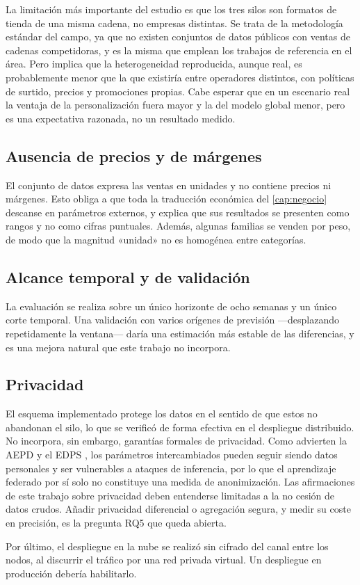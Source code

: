 La limitación más importante del estudio es que los tres silos son formatos de tienda de una misma
cadena, no empresas distintas. Se trata de la metodología estándar del campo, ya que no existen
conjuntos de datos públicos con ventas de cadenas competidoras, y es la misma que emplean los
trabajos de referencia en el área. Pero implica que la heterogeneidad reproducida, aunque real, es
probablemente menor que la que existiría entre operadores distintos, con políticas de surtido,
precios y promociones propias. Cabe esperar que en un escenario real la ventaja de la
personalización fuera mayor y la del modelo global menor, pero es una expectativa razonada, no un
resultado medido.

\subsection{Ausencia de precios y de márgenes}

El conjunto de datos expresa las ventas en unidades y no contiene precios ni márgenes. Esto obliga a
que toda la traducción económica del \cref{cap:negocio} descanse en parámetros externos, y explica
que sus resultados se presenten como rangos y no como cifras puntuales. Además, algunas familias se
venden por peso, de modo que la magnitud «unidad» no es homogénea entre categorías.

\subsection{Alcance temporal y de validación}

La evaluación se realiza sobre un único horizonte de ocho semanas y un único corte temporal. Una
validación con varios orígenes de previsión —desplazando repetidamente la ventana— daría una
estimación más estable de las diferencias, y es una mejora natural que este trabajo no incorpora.

\subsection{Privacidad}

El esquema implementado protege los datos en el sentido de que estos no abandonan el silo, lo que se
verificó de forma efectiva en el despliegue distribuido. No incorpora, sin embargo, garantías
formales de privacidad. Como advierten la AEPD y el EDPS \parencite{aepdedps2025}, los parámetros
intercambiados pueden seguir siendo datos personales y ser vulnerables a ataques de inferencia, por
lo que el aprendizaje federado por sí solo no constituye una medida de anonimización. Las
afirmaciones de este trabajo sobre privacidad deben entenderse limitadas a la no cesión de datos
crudos. Añadir privacidad diferencial o agregación segura, y medir su coste en precisión, es la
pregunta RQ5 que queda abierta.

Por último, el despliegue en la nube se realizó sin cifrado del canal entre los nodos, al discurrir
el tráfico por una red privada virtual. Un despliegue en producción debería habilitarlo.
